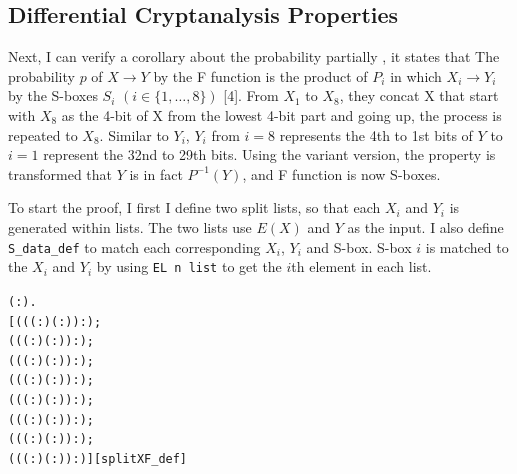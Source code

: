 \documentclass{article}
\begin{document}
\subsection{Differential Cryptanalysis Properties}
Next, I can verify a corollary about the probability partially , it states that
The probability $p$ of $X \rightarrow Y$ by the F function is the product of $P_i$ in
which $X_i \rightarrow Y_i$ by the S-boxes $S_i$ $(i \in \{1, \dots, 8\})$ [4]. From $X_1$ to $X_8$, they concat X that
start with $X_8$ as the 4-bit of X from the lowest 4-bit part and going up, the process is repeated to $X_8$.
Similar to $Y_i$, $Y_i$ from $i=8$ represents the 4th to 1st bits of $Y$ to $i=1$ represent the 32nd to 29th bits.
Using the variant version, the property is transformed that $Y$ is in fact $P^{-1}(Y)$, and F function is now S-boxes.

To start the proof, I first I define two split lists, so that each $X_i$ and $Y_i$ is generated within lists. The two lists
use $E(X)$ and $Y$ as the input. I also define \verb|S_data_def| to match each corresponding $X_i$, $Y_i$ and S-box. S-box $i$
is matched to the $X_i$ and $Y_i$ by using \verb|EL n list| to get the $i$th element in each list.

\begin{alltt}
\HOLTokenTurnstile{} \HOLSymConst{\HOLTokenForall{}}( :).
       \HOLSymConst{=}
     [((( :) \HOLSymConst{\HOLTokenExtract{}} ( :))  :);
      ((( :) \HOLSymConst{\HOLTokenExtract{}} ( :))  :);
      ((( :) \HOLSymConst{\HOLTokenExtract{}} ( :))  :);
      ((( :) \HOLSymConst{\HOLTokenExtract{}} ( :))  :);
      ((( :) \HOLSymConst{\HOLTokenExtract{}} ( :))  :);
      ((( :) \HOLSymConst{\HOLTokenExtract{}} ( :))  :);
      ((( :) \HOLSymConst{\HOLTokenExtract{}} ( :))  :);
      ((( :) \HOLSymConst{\HOLTokenExtract{}} ( :))  :)]\hfill{[splitXF_def]}
\end{alltt}
\end{document}
